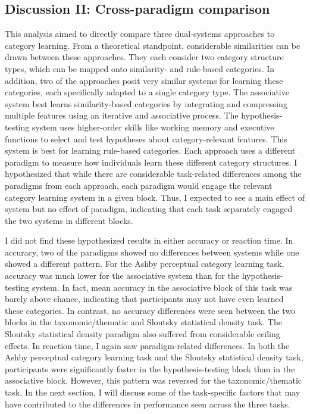 \documentclass[../dissertation.tex]{subfiles}
\begin{document}
	
\subsection{Discussion II: Cross-paradigm comparison}

This analysis aimed to directly compare three dual-systems approaches to category learning. From a theoretical standpoint, considerable similarities can be drawn between these approaches. They each consider two category structure types, which can be mapped onto similarity- and rule-based categories. In addition, two of the approaches posit very similar systems for learning these categories, each specifically adapted to a single category type. The associative system best learns similarity-based categories by integrating and compressing multiple features using an iterative and associative process. The hypothesis-testing system uses higher-order skills like working memory and executive functions to select and test hypotheses about category-relevant features. This system is best for learning rule-based categories. Each approach uses a different paradigm to measure how individuals learn these different category structures. I hypothesized that while there are considerable task-related differences among the paradigms from each approach, each paradigm would engage the relevant category learning system in a given block. Thus, I expected to see a main effect of system but no effect of paradigm, indicating that each task separately engaged the two systems in different blocks. \par
	I did not find these hypothesized results in either accuracy or reaction time. In accuracy, two of the paradigms showed no differences between systems while one showed a different pattern. For the Ashby perceptual category learning task, accuracy was much lower for the associative system than for the hypothesis-testing system. In fact, mean accuracy in the associative block of this task was barely above chance, indicating that participants may not have even learned these categories. In contrast, no accuracy differences were seen between the two blocks in the taxonomic/thematic and Sloutsky statistical density task. The Sloutsky statistical density paradigm also suffered from considerable ceiling effects. In reaction time, I again saw paradigm-related differences. In both the Ashby perceptual category learning task and the Sloutsky statistical density task, participants were significantly faster in the hypothesis-testing block than in the associative block. However, this pattern was reversed for the taxonomic/thematic task. In the next section, I will discuss some of the task-specific factors that may have contributed to the differences in performance seen across the three tasks. \par
	
\end{document}
